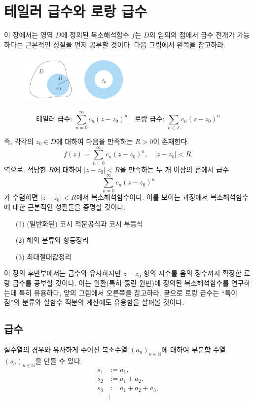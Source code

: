 
\chapter{테일러 급수와 로랑 급수}

이 장에서는 영역 $D$에 정의된 복소해석함수 $f$는 
$D$의 임의의 점에서 급수 전개가 가능하다는 근본적인 성질을 먼저 공부할 것이다.
다음 그림에서 왼쪽을 참고하라.
\begin{figure}[h!]
\begin{center}
\includegraphics[width=0.5\textwidth]{./SaltChapter/fig-4-0-1}
\end{center}
\end{figure}
\[
\text{테일러 급수: } \sum_{n=0}^\infty c_n(z-z_0)^n 
\quad
\text{로랑 급수: } \sum_{n\in \mathbb Z} c_n(z-z_0)^n 
\]

즉, 각각의 $z_0 \in D$에 대하여 다음을 만족하는 $R>0$이 존재한다.
\[
f(z) = \sum_{n=0}^\infty c_n(z-z_0)^n, \quad |z-z_0| <R.
\]
역으로,  적당한 $R$에 대하여 $|z-z_0|<R$을 만족하는 두 개 이상의 점에서 급수
\[
\sum_{n=0}^\infty c_n(z-z_0)^n
\]
가 수렴하면 $|z-z_0|<R$에서 복소해석함수이다.
이를 보이는 과정에서 복소해석함수에 대한 근본적인 성질들을 증명할 것이다.
\begin{itemize}
\item[(1)] (일반화된) 코시 적분공식과 코시 부등식
\item[(2)] 해의 분류와 항등정리
\item[(3)] 최대절대값정리
\end{itemize}

이 장의 후반부에서는
급수와 유사하지만 $z-z_0$ 항의 지수를 음의 정수까지 확장한
로랑 급수를 공부할 것이다.
이는 원환(특히 뚫린 원판)에 정의된 복소해석함수를 연구하는데 특히 유용하다,
앞의 그림에서 오른쪽을 참고하라.
끝으로 로랑 급수는 ``특이점''의 분류와 실함수 적분의 계산에도 유용함을 살펴볼 것이다.

\section{급수}

실수열의 경우와 유사하게 주어진
복소수열 $(a_n)_{n\in\mathbb N}$에 대하여
부분합 수열 $(s_n)_{n\in\mathbb N}$을 만들 수 있다.
\begin{align*}
s_1 &:= a_1, \\
s_2 &:= a_1 + a_2, \\
s_3 &:= a_1 + a_2 + a_3, \\
& \vdots
\end{align*}

